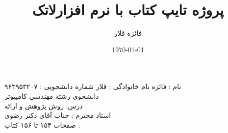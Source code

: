 \documentclass[a4 paper,12pt]{article}\usepackage{xepersian}
\title{پروژه تایپ کتاب با نرم افزارلاتک}
\author{فائزه قلار}
\date{\today}
\begin{document}
\maketitle



\noindent
نام : فائزه  نام خانوادگی : قلار          شماره دانشجویی : ۹۶۳۹۵۳۲۰۷ \\ دانشچوی رشته مهندسی کامپیوتر  \\ درس:  روش پژوهش و ارائه  \\ استاد محترم : جناب آقای دکتر رضوی \\

\noindent
 صفحات ۱۵۴ تا ۱۵۶  کتاب :                                                                                                                                                                                                                                                                                                                                                          \

\vspace{0.1cm}
\vspace{0.1cm}
\end{document}

